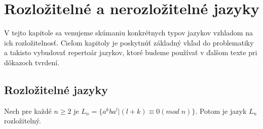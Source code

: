 \chapter[Rozložitelné a nerozložitelné jazyky]{Rozložitelné a nerozložitelné jazyky}
\label{kap:languages}

V tejto kapitole sa venujeme skúmaniu konkrétnych typov jazykov vzhladom na ich rozložitelnosť. Cieľom kapitoly je poskytnúť základný vhľad do problematiky a takisto vybudovať repertoár jazykov, ktoré budeme používať v ďalšom texte pri dôkazoch tvrdení.

\section{Rozložitelné jazyky}

\begin{theorem}
Nech pre každé $ n \geq 2 $ je $ L_{n} = \lbrace a^{k}ba^{l} | (l+k) \equiv 0 (mod \; n) \rbrace $. Potom je jazyk $ L_n $ rozložitelný.
\end{theorem}

